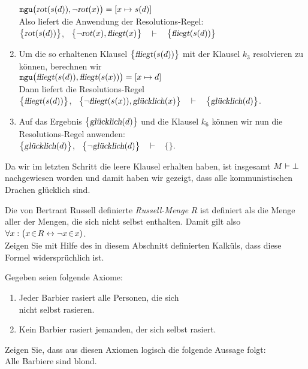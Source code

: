 \begin{enumerate}
      $\mathtt{mgu}\bigl(\textsl{rot}(s(d)), \neg \textsl{rot}(x)\bigr) = [x \mapsto s(d)]$
      \\[0.2cm]
      Also liefert die Anwendung der Resolutions-Regel:
      \\[0.2cm]
      \hspace*{1.3cm}
      $\bigl\{\textsl{rot}(s(d))\bigl\}$, \ $\bigl\{\neg \textsl{rot}(x), \textsl{fliegt}(x)\bigl\}$ \ $\vdash$ \ $\bigl\{\textsl{fliegt}(s(d))\bigl\}$
\item Um die so erhaltenen Klausel $\bigl\{\textsl{fliegt}(s(d))\bigl\}$ mit der Klausel
      $k_3$ resolvieren zu können, berechnen wir
      \\[0.2cm]
      \hspace*{1.3cm}
      $\mathtt{mgu}\bigl(\textsl{fliegt}(s(d)), \textsl{fliegt}(s(x))\bigr) = [x \mapsto d]$
      \\[0.2cm]
      Dann liefert die Resolutions-Regel
      \\[0.2cm]
      \hspace*{1.3cm}
      $\bigl\{\textsl{fliegt}(s(d))\bigl\}$, \ $\bigl\{\neg \textsl{fliegt}(s(x)), \textsl{glücklich}(x)\bigl\}$ \ $\vdash$ \ $\bigl\{\textsl{glücklich}(d)\bigl\}$.
\item Auf das Ergebnis $\bigl\{\textsl{glücklich}(d)\bigl\}$ und die Klausel $k_6$ können
      wir nun die Resolutions-Regel anwenden:
      \\[0.2cm]
      \hspace*{1.3cm}
      $\bigl\{\textsl{glücklich}(d)\bigl\}$, \  $\bigl\{\neg \textsl{glücklich}(d)\bigl\}$ \ $\vdash$ \ $\bigl\{\bigl\}$.
\end{enumerate}
Da wir im letzten Schritt die leere Klausel erhalten haben,  ist insgesamt $M \vdash
\bot$ 
nachgewiesen worden und damit haben wir gezeigt, dass alle kommunistischen Drachen glücklich sind. 
\eox

\exercise
Die von Bertrant Russell definierte \emph{Russell-Menge} $R$ ist
definiert als die Menge aller der Mengen, die sich nicht selbst enthalten.   Damit gilt also
\\[0.2cm]
\hspace*{1.3cm}
$\forall x: \bigl( x \!\in\! R \leftrightarrow \neg x \!\in\! x)$.
\\[0.2cm]
Zeigen Sie mit Hilfe des in diesem Abschnitt definierten Kalküls, dass diese Formel
widersprüchlich ist. 
\vspace{0.3cm}

\exercise
Gegeben seien folgende Axiome:
\begin{enumerate}
\item Jeder Barbier rasiert alle Personen, die sich\\ nicht selbst rasieren.
\item Kein Barbier rasiert jemanden, der sich selbst rasiert.
\end{enumerate}
Zeigen Sie, dass aus diesen Axiomen logisch die folgende Aussage folgt: \\[0.3cm]
\hspace*{1.3cm} Alle Barbiere sind blond.

